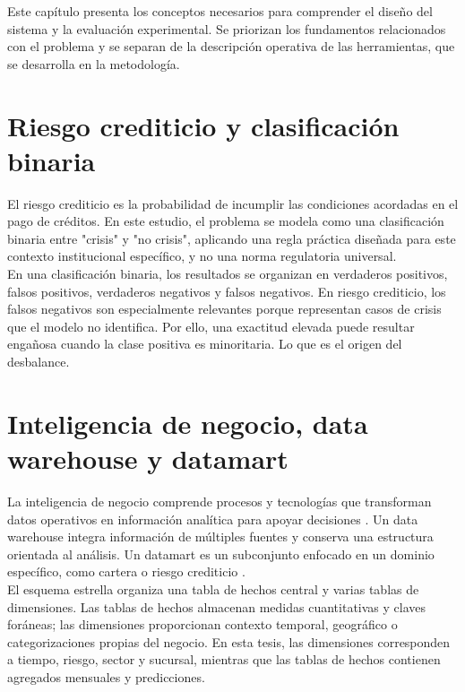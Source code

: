 Este capítulo presenta los conceptos necesarios para comprender el diseño del sistema y la evaluación experimental. Se priorizan los fundamentos relacionados con el problema y se separan de la descripción operativa de las herramientas, que se desarrolla en la metodología.

\section{Riesgo crediticio y clasificación binaria}

El riesgo crediticio es la probabilidad de incumplir las condiciones acordadas en el pago de créditos. En este estudio, el problema se modela como una clasificación binaria entre "crisis" y "no crisis", aplicando una regla práctica diseñada para este contexto institucional específico, y no una norma regulatoria universal.\\

En una clasificación binaria, los resultados se organizan en verdaderos positivos, falsos positivos, verdaderos negativos y falsos negativos. En riesgo crediticio, los falsos negativos son especialmente relevantes porque representan casos de crisis que el modelo no identifica. Por ello, una exactitud elevada puede resultar engañosa cuando la clase positiva es minoritaria. Lo que es el origen del desbalance.

\section{Inteligencia de negocio, \newline data warehouse y datamart}

La inteligencia de negocio comprende procesos y tecnologías que transforman datos operativos en información analítica para apoyar decisiones \cite{laursen2017business}. Un data warehouse integra información de múltiples fuentes y conserva una estructura orientada al análisis. Un datamart es un subconjunto enfocado en un dominio específico, como cartera o riesgo crediticio \cite{kimball2013datawarehouse}.\\

El esquema estrella organiza una tabla de hechos central y varias tablas de dimensiones. Las tablas de hechos almacenan medidas cuantitativas y claves foráneas; las dimensiones proporcionan contexto temporal, geográfico o categorizaciones propias del negocio. En esta tesis, las dimensiones corresponden a tiempo, riesgo, sector y sucursal, mientras que las tablas de hechos contienen agregados mensuales y predicciones.

